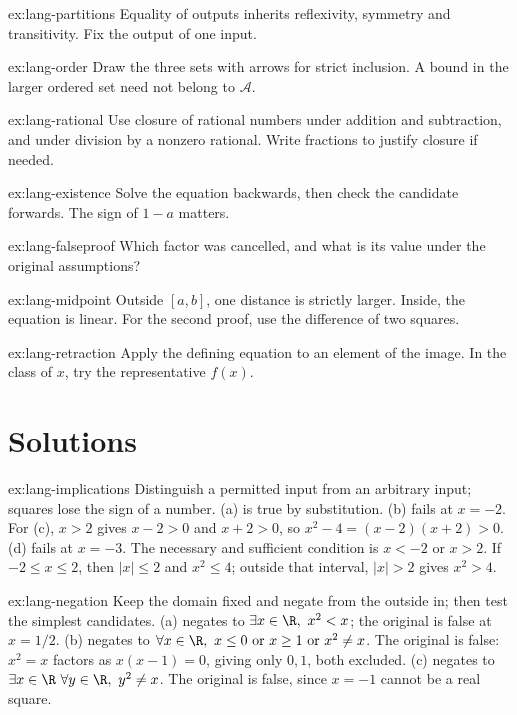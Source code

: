 \begin{hint}{ex:lang-partitions}
Equality of outputs inherits reflexivity, symmetry and transitivity. Fix the output of one input.
\end{hint}
\begin{hint}{ex:lang-order}
Draw the three sets with arrows for strict inclusion. A bound in the larger ordered set
need not belong to $\mathcal A$.
\end{hint}
\begin{hint}{ex:lang-rational}
Use closure of rational numbers under addition and subtraction, and under division by
a nonzero rational. Write fractions to justify closure if needed.
\end{hint}
\begin{hint}{ex:lang-existence}
Solve the equation backwards, then check the candidate forwards. The sign of $1-a$ matters.
\end{hint}
\begin{hint}{ex:lang-falseproof}
Which factor was cancelled, and what is its value under the original assumptions?
\end{hint}
\begin{hint}{ex:lang-midpoint}
Outside $[a,b]$, one distance is strictly larger. Inside, the equation is linear.
For the second proof, use the difference of two squares.
\end{hint}
\begin{hint}{ex:lang-retraction}
Apply the defining equation to an element of the image. In the class of $x$, try the representative $f(x)$.
\end{hint}

\section{Solutions}

\begin{solution}{ex:lang-implications}
\idea Distinguish a permitted input from an arbitrary input; squares lose the sign of a number.
\writeup (a) is true by substitution. (b) fails at $x=-2$. For (c), $x>2$ gives
$x-2>0$ and $x+2>0$, so $x^2-4=(x-2)(x+2)>0$. (d) fails at $x=-3$.
The necessary and sufficient condition is $x<-2$ or $x>2$. If $-2\le x\le2$,
then $|x|\le2$ and $x^2\le4$; outside that interval, $|x|>2$ gives $x^2>4$.
\end{solution}

\begin{solution}{ex:lang-negation}
\idea Keep the domain fixed and negate from the outside in; then test the simplest candidates.
\writeup (a) negates to $\exists x\in\R,\ x^2<x$; the original is false at $x=1/2$.
(b) negates to
$\forall x\in\R,\ x\le0\ \hbox{or}\ x\ge1\ \hbox{or}\ x^2\ne x$.
The original is false: $x^2=x$ factors as $x(x-1)=0$, giving only $0,1$, both excluded.
(c) negates to $\exists x\in\R\ \forall y\in\R,\ y^2\ne x$.
The original is false, since $x=-1$ cannot be a real square.
\end{solution}

